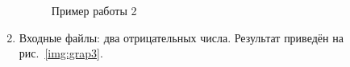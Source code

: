 \documentclass[12pt, a4paper]{article}
\begin{document}
\begin{enumerate}
\begin{figure}[h]
  		\caption{Пример работы 2}
  		\label{img:grap2}
	\end{figure}
	\newpage
	\item Входные файлы: два отрицательных числа.
	Результат приведён на рис.~\ref{img:grap3}.
	\begin{figure}[h]

\end{figure}
\end{enumerate}
\end{document}
